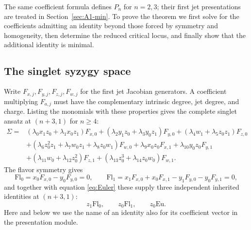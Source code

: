 \documentclass[10pt,reqno]{amsart}
\numberwithin{equation}{section}
\theoremstyle{plain}
\theoremstyle{definition}
\newcommand{\Eu}{\mathrm{Eu}}
\newcommand{\Fl}{\mathrm{Fl}}
\begin{document}
The same coefficient formula defines $P_n$ for $n=2,3$; their first jet presentations are treated in Section~\ref{sec:A1-min}. To prove the theorem we first solve for the coefficients admitting an identity beyond those forced by symmetry and homogeneity, then determine the reduced critical locus, and finally show that the additional identity is minimal.

\subsection{The singlet syzygy space}

Write $F_{x,j},F_{y,j},F_{z,j},F_{w,j}$ for the first jet Jacobian generators. A coefficient multiplying $F_{a,j}$ must have the complementary intrinsic degree, jet degree, and charge. Listing the monomials with these properties gives the complete singlet ansatz at $(n+3,1)$ for $n\ge4$:
\begin{equation}\label{eq:A1-ansatz}
\begin{split}
	\Sigma={}&(\lambda_0x_1z_0+\lambda_1x_0z_1)F_{x,0}+(\lambda_2y_1z_0+\lambda_3y_0z_1)F_{y,0} +(\lambda_4w_1+\lambda_5z_0z_1)F_{z,0}\\
	&+(\lambda_6z_0^2z_1+\lambda_7w_0z_1+\lambda_8z_0w_1)F_{w,0} +\lambda_9x_0z_0F_{x,1}+\lambda_{10}y_0z_0F_{y,1}\\
	&+(\lambda_{11}w_0+\lambda_{12}z_0^2)F_{z,1}+(\lambda_{13}z_0^3+\lambda_{14}z_0w_0)F_{w,1}.
\end{split}
\end{equation}
The flavor symmetry gives
\begin{equation*}
	\Fl_0=x_0F_{x,0}-y_0F_{y,0}=0,\qquad \Fl_1=x_1F_{x,0}+x_0F_{x,1}-y_1F_{y,0}-y_0F_{y,1}=0,
\end{equation*}
and together with equation \eqref{eq:Euler} these supply three independent inherited identities at $(n+3,1)$:
\begin{equation}\label{eq:A1inherited}
	z_1\Fl_0,\qquad z_0\Fl_1,\qquad z_0\Eu .
\end{equation}
Here and below we use the name of an identity also for its coefficient vector in the presentation module.
\end{document}
